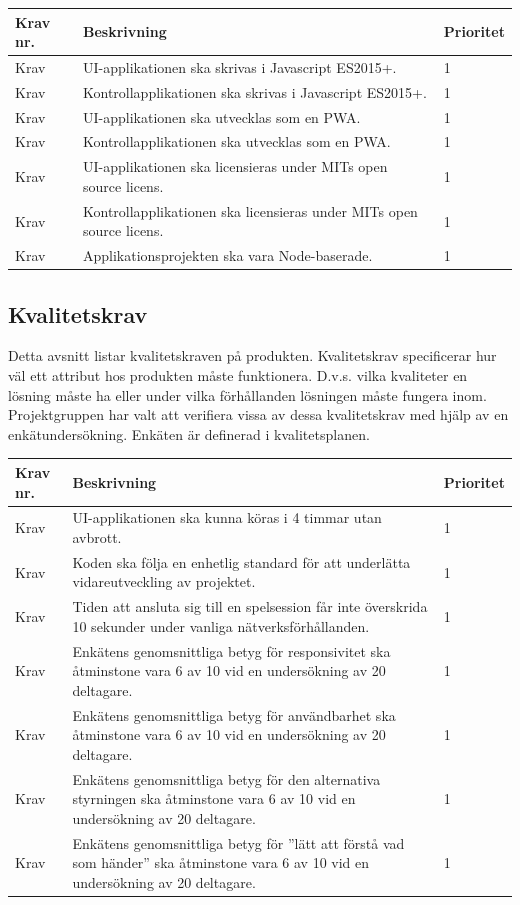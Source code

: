 \documentclass[10pt]{article}
\newcounter{indexcounter}
\newcommand{\Krav}[2]{
	\stepcounter{indexcounter}
	Krav \arabic{indexcounter} & #1 & #2 \\ \hline
}
\begin{document}
	\begin{tabular}{| p{2cm} | p{8cm} | p{2cm}|}
		\hline
		\textbf{Krav nr.} & \textbf{Beskrivning} & \textbf{Prioritet} \\ \hline
		
		\Krav{UI-applikationen ska skrivas i Javascript ES2015+.}{1}
		\Krav{Kontrollapplikationen ska skrivas i Javascript ES2015+.}{1}
		\Krav{UI-applikationen ska utvecklas som en PWA.}{1}
		\Krav{Kontrollapplikationen ska utvecklas som en PWA.}{1}
		\Krav{UI-applikationen ska licensieras under MITs open source licens.}{1}
		\Krav{Kontrollapplikationen ska licensieras under MITs open source licens.}{1}
		\Krav{Applikationsprojekten ska vara Node-baserade.}{1}
		
	\end{tabular}
\pagebreak
	\subsection{Kvalitetskrav}
	Detta avsnitt listar kvalitetskraven på produkten. Kvalitetskrav specificerar hur väl ett attribut hos produkten måste funktionera. D.v.s. vilka kvaliteter en lösning måste ha eller under vilka förhållanden lösningen måste fungera inom. Projektgruppen har valt att verifiera vissa av dessa kvalitetskrav med hjälp av en enkätundersökning. Enkäten är definerad i kvalitetsplanen. \\
	
		\begin{tabular}{|p{2cm}|p{8cm}|p{2cm}|}
		\hline
		\textbf{Krav nr.} & \textbf{Beskrivning} & \textbf{Prioritet} \\ \hline
		
		\Krav{UI-applikationen ska kunna köras i 4 timmar utan avbrott.}{1}
		\Krav{Koden ska följa en enhetlig standard\cite{bib-kvalitetsplan} för att underlätta vidareutveckling av projektet.}{1}
		\Krav{Tiden att ansluta sig till en spelsession får inte överskrida 10 sekunder under vanliga nätverksförhållanden.}{1}
        \Krav{Enkätens\cite{bib-kvalitetsplan} genomsnittliga betyg för responsivitet ska åtminstone vara 6 av 10 vid en undersökning av 20 deltagare.}{1}
		\Krav{Enkätens\cite{bib-kvalitetsplan} genomsnittliga betyg för användbarhet ska åtminstone vara 6 av 10 vid en undersökning av 20 deltagare.}{1}
		\Krav{Enkätens\cite{bib-kvalitetsplan} genomsnittliga betyg för den alternativa styrningen ska åtminstone vara 6 av 10 vid en undersökning av 20 deltagare.}{1}
		\Krav{Enkätens\cite{bib-kvalitetsplan} genomsnittliga betyg för ''lätt att förstå vad som händer'' ska åtminstone vara 6 av 10 vid en undersökning av 20 deltagare.}{1}
				
	\end{tabular}
	

\pagebreak

\printbibliography
{}
\end{document}
